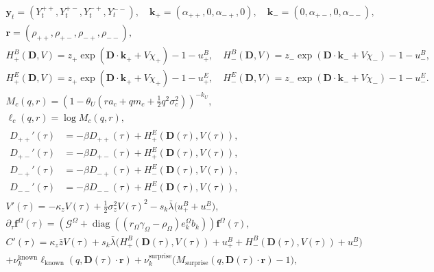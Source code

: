 \documentclass[11pt]{article}
\begin{document}
    \begin{gather*}
        \mathbf{y}_t=(Y_t^{++},Y_t^{+-},Y_t^{-+},Y_t^{--}),
        \quad
        \mathbf{k}_+=(\alpha_{++},0,\alpha_{-+},0),
        \quad
        \mathbf{k}_-=(0,\alpha_{+-},0,\alpha_{--}),\\
        \mathbf{r}=(\rho_{++},\rho_{+-},\rho_{-+},\rho_{--}),\\
        H_+^B(\mathbf{D},V)=z_+\exp(\mathbf{D}\cdot\mathbf{k}_++V\chi_+)-1-u_+^B,
        \quad
        H_-^B(\mathbf{D},V)=z_-\exp(\mathbf{D}\cdot\mathbf{k}_-+V\chi_-)-1-u_-^B,\\
        H_+^E(\mathbf{D},V)=z_+\exp(\mathbf{D}\cdot\mathbf{k}_++V\chi_+)-1-u_+^E,
        \quad
        H_-^E(\mathbf{D},V)=z_-\exp(\mathbf{D}\cdot\mathbf{k}_-+V\chi_-)-1-u_-^E.\\
        M_c(q,r)
        =
        \left(
            1-\theta_U\left(ra_c+qm_c+\frac{1}{2}q^2\sigma_c^2\right)
        \right)^{-k_U},\\
        \ell_c(q,r)=\log M_c(q,r),\\
        \begin{aligned}
            D_{++}'(\tau) &= -\beta D_{++}(\tau) + H_+^E(\mathbf{D}(\tau),V(\tau)),\\
            D_{+-}'(\tau) &= -\beta D_{+-}(\tau) + H_+^E(\mathbf{D}(\tau),V(\tau)),\\
            D_{-+}'(\tau) &= -\beta D_{-+}(\tau) + H_-^E(\mathbf{D}(\tau),V(\tau)),\\
            D_{--}'(\tau) &= -\beta D_{--}(\tau) + H_-^E(\mathbf{D}(\tau),V(\tau)),
        \end{aligned}\\
        V'(\tau)
        =
        -\kappa_z V(\tau)
        +\frac{1}{2}\sigma_z^2 V(\tau)^2
        -s_k\bar{\lambda}\big(u_+^B+u_-^B\big),\\
        \partial_\tau\mathbf f^\Omega(\tau)
        =
        \left(\mathcal G^\Omega+\operatorname{diag}((r_\Omega\gamma_\Omega-\rho_\Omega)e_k^\Omega b_k)\right)
        \mathbf f^\Omega(\tau),\\
        C'(\tau)
        =
        \kappa_z\bar z V(\tau)
        +s_k\bar{\lambda}\Big(
            H_+^B(\mathbf{D}(\tau),V(\tau))+u_+^B
            +H_-^B(\mathbf{D}(\tau),V(\tau))+u_-^B
        \Big)\\
        +\nu_k^{\mathrm{known}}\ell_{\mathrm{known}}(q,\mathbf{D}(\tau)\cdot\mathbf{r})
        +\nu_k^{\mathrm{surprise}}\Big(M_{\mathrm{surprise}}(q,\mathbf{D}(\tau)\cdot\mathbf{r})-1\Big),\\
    \end{gather*}
\end{document}
